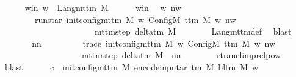 \begin{isabellebody}
\ \ \ \ \isamarkupfalse%
\ w{\isacharunderscore}{\kern0pt}in{\isacharcolon}{\kern0pt}\ {\isachardoublequoteopen}w\ {\isasymin}\ Lang{\isacharunderscore}{\kern0pt}mttm\ M{\isachardoublequoteclose}\isanewline
\ \ \ \ \isamarkupfalse%
\ w{\isacharunderscore}{\kern0pt}in\ \isamarkupfalse%
\ w{\isacharprime}{\kern0pt}\ nw\ \isanewline
\ \ \ \ \ \ \ \ run{\isacharunderscore}{\kern0pt}star{\isacharcolon}{\kern0pt}\ {\isachardoublequoteopen}{\isacharparenleft}{\kern0pt}init{\isacharunderscore}{\kern0pt}config{\isacharunderscore}{\kern0pt}mttm\ M\ w{\isacharcomma}{\kern0pt}\ Config\isactrlsub M\ {\isacharparenleft}{\kern0pt}t{\isacharunderscore}{\kern0pt}tm\ M{\isacharparenright}{\kern0pt}\ w{\isacharprime}{\kern0pt}\ nw{\isacharparenright}{\kern0pt}\isanewline
\ \ \ \ \ \ \ \ \ \ \ \ \ \ \ \ \ \ \ \ \ {\isasymin}\ {\isacharparenleft}{\kern0pt}mttm{\isacharunderscore}{\kern0pt}step\ {\isacharparenleft}{\kern0pt}delta{\isacharunderscore}{\kern0pt}tm\ M{\isacharparenright}{\kern0pt}{\isacharparenright}{\kern0pt}\isactrlsup {\isacharasterisk}{\kern0pt}{\isachardoublequoteclose}\isanewline
\ \ \ \ \ \ \isamarkupfalse%
\ Lang{\isacharunderscore}{\kern0pt}mttm{\isacharunderscore}{\kern0pt}def\ \isamarkupfalse%
\ blast\isanewline
\ \ \ \ \isamarkupfalse%
\ \isamarkupfalse%
\ nn\ \isanewline
\ \ \ \ \ \ \ \ trace{\isacharcolon}{\kern0pt}\ {\isachardoublequoteopen}{\isacharparenleft}{\kern0pt}init{\isacharunderscore}{\kern0pt}config{\isacharunderscore}{\kern0pt}mttm\ M\ w{\isacharcomma}{\kern0pt}\ Config\isactrlsub M\ {\isacharparenleft}{\kern0pt}t{\isacharunderscore}{\kern0pt}tm\ M{\isacharparenright}{\kern0pt}\ w{\isacharprime}{\kern0pt}\ nw{\isacharparenright}{\kern0pt}\isanewline
\ \ \ \ \ \ \ \ \ \ \ \ \ \ \ \ \ \ {\isasymin}\ {\isacharparenleft}{\kern0pt}mttm{\isacharunderscore}{\kern0pt}step\ {\isacharparenleft}{\kern0pt}delta{\isacharunderscore}{\kern0pt}tm\ M{\isacharparenright}{\kern0pt}{\isacharparenright}{\kern0pt}\ {\isacharcircum}{\kern0pt}{\isacharcircum}{\kern0pt}\ nn{\isachardoublequoteclose}\isanewline
\ \ \ \ \ \ \isamarkupfalse%
\ rtrancl{\isacharunderscore}{\kern0pt}imp{\isacharunderscore}{\kern0pt}relpow\ \isamarkupfalse%
\ blast\isanewline
\ \ \ \ \isamarkupfalse%
\ {\isacharquery}{\kern0pt}c{\isacharprime}{\kern0pt}\ {\isacharequal}{\kern0pt}\ {\isachardoublequoteopen}init{\isacharunderscore}{\kern0pt}config{\isacharunderscore}{\kern0pt}mttm\ {\isacharquery}{\kern0pt}M{\isacharprime}{\kern0pt}\ {\isacharparenleft}{\kern0pt}encode{\isacharunderscore}{\kern0pt}input{\isacharunderscore}{\kern0pt}ar\ {\isacharparenleft}{\kern0pt}{\isasymGamma}{\isacharunderscore}{\kern0pt}tm\ M{\isacharparenright}{\kern0pt}\ {\isacharparenleft}{\kern0pt}bl{\isacharunderscore}{\kern0pt}tm\ M{\isacharparenright}{\kern0pt}\ w{\isacharparenright}{\kern0pt}{\isachardoublequoteclose}\isanewline

\end{isabellebody}
